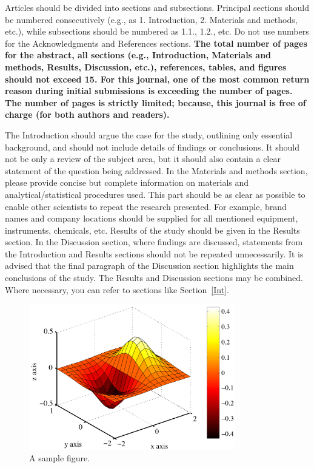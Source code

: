 \documentclass{elektr}
\begin{document}
Articles should be divided into sections and subsections. Principal sections should be numbered consecutively (e.g., as 1. Introduction, 2. Materials and methods, etc.), while subsections should be numbered as 1.1., 1.2., etc. Do not use numbers for the Acknowledgments and References sections. \textbf{The total number of pages for the abstract, all sections (e.g., Introduction, Materials and methods, Results, Discussion, etc.), references, tables, and figures should not exceed {\Large 15}. For this journal, one of the most common return reason during initial submissions is exceeding the number of pages. The number of pages is strictly limited; because, this journal is free of charge (for both authors and readers).} 

The Introduction should argue the case for the study, outlining only essential background, and should not include details of findings or conclusions. It should not be only a review of the subject area, but it should also contain a clear statement of the question being addressed. In the Materials and methods section, please provide concise but complete information on materials and analytical/statistical procedures used. This part should be as clear as possible to enable other scientists to repeat the research presented. For example, brand names and company locations should be supplied for all mentioned equipment, instruments, chemicals, etc. Results of the study should be given in the Results section. In the Discussion section, where findings are discussed, statements from the Introduction and Results sections should not be repeated unnecessarily. It is advised that the final paragraph of the Discussion section highlights the main conclusions of the study. The Results and Discussion sections may be combined. Where necessary, you can refer to sections like Section~\ref{Int}.

\begin{figure}[h!]
\begin{center}
\includegraphics[width=9.0cm]{figure_example}
\caption{A sample figure.}
\label{fig1}
\end{center}\vs{-4mm}
\end{figure}
\end{document}
